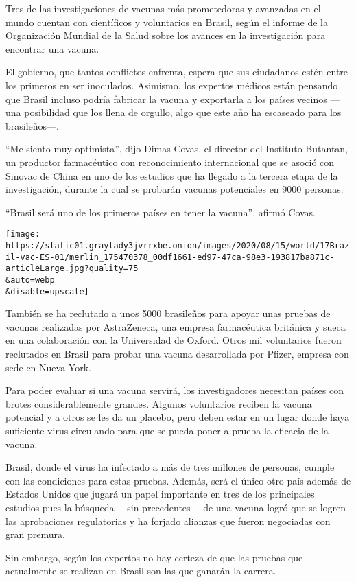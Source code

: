Tres de las investigaciones de vacunas más prometedoras y avanzadas en
el mundo cuentan con científicos y voluntarios en Brasil, según el
informe de la Organización Mundial de la Salud sobre los avances en la
investigación para encontrar una vacuna.

El gobierno, que tantos conflictos enfrenta, espera que sus ciudadanos
estén entre los primeros en ser inoculados. Asimismo, los expertos
médicos están pensando que Brasil incluso podría fabricar la vacuna y
exportarla a los países vecinos ---una posibilidad que los llena de
orgullo, algo que este año ha escaseado para los brasileños---.

``Me siento muy optimista'', dijo Dimas Covas, el director del Instituto
Butantan, un productor farmacéutico con reconocimiento internacional que
se asoció con Sinovac de China en uno de los estudios que ha llegado a
la tercera etapa de la investigación, durante la cual se probarán
vacunas potenciales en 9000 personas.

``Brasil será uno de los primeros países en tener la vacuna'', afirmó
Covas.

\texttt{[image: https://static01.graylady3jvrrxbe.onion/images/2020/08/15/world/17Brazil-vac-ES-01/merlin\_175470378\_00df1661-ed97-47ca-98e3-193817ba871c-articleLarge.jpg?quality=75\\\&auto=webp\\\&disable=upscale]}

También se ha reclutado a unos 5000 brasileños para apoyar unas pruebas
de vacunas realizadas por AstraZeneca, una empresa farmacéutica
británica y sueca en una colaboración con la Universidad de Oxford.
Otros mil voluntarios fueron reclutados en Brasil para probar una vacuna
desarrollada por Pfizer, empresa con sede en Nueva York.

Para poder evaluar si una vacuna servirá, los investigadores necesitan
países con brotes considerablemente grandes. Algunos voluntarios reciben
la vacuna potencial y a otros se les da un placebo, pero deben estar en
un lugar donde haya suficiente virus circulando para que se pueda poner
a prueba la eficacia de la vacuna.

Brasil, donde el virus ha infectado a más de tres millones de personas,
cumple con las condiciones para estas pruebas. Además, será el único
otro país además de Estados Unidos que jugará un papel importante en
tres de los principales estudios pues la búsqueda ---sin precedentes---
de una vacuna logró que se logren las aprobaciones regulatorias y ha
forjado alianzas que fueron negociadas con gran premura.

Sin embargo, según los expertos no hay certeza de que las pruebas que
actualmente se realizan en Brasil son las que ganarán la carrera.

